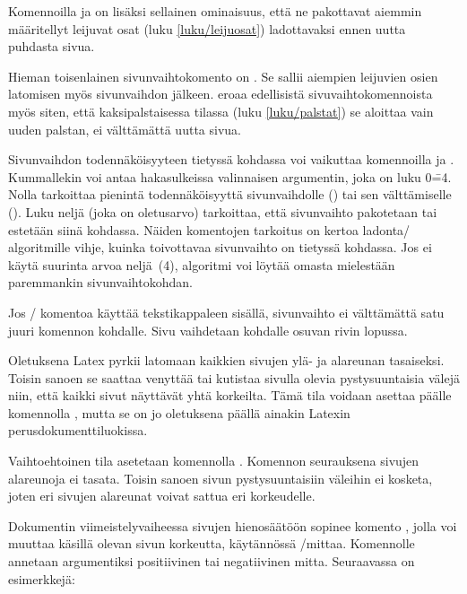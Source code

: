 Komennoilla  ja  on lisäksi
sellainen ominaisuus, että ne pakottavat aiemmin määritellyt leijuvat
osat (luku \ref{luku/leijuosat}) ladottavaksi ennen uutta puhdasta
sivua.

Hieman toisenlainen sivunvaihtokomento on . Se sallii
aiempien leijuvien osien latomisen myös sivunvaihdon jälkeen.
 eroaa edellisistä sivuvaihtokomennoista myös siten,
että kaksipalstaisessa tilassa (luku \ref{luku/palstat}) se aloittaa
vain uuden palstan, ei välttämättä uutta sivua.

Sivunvaihdon todennäköisyyteen tietyssä kohdassa voi vaikuttaa
komennoilla  ja . Kummallekin
voi antaa hakasulkeissa valinnaisen argumentin, joka on luku 0\==4.
Nolla tarkoittaa pienintä todennäköisyyttä sivunvaihdolle
() tai sen välttämiselle
(). Luku neljä (joka on oletusarvo)
tarkoittaa, että sivunvaihto pakotetaan tai estetään siinä kohdassa.
Näiden komentojen tarkoitus on kertoa ladonta\-/ algoritmille vihje,
kuinka toivottavaa sivunvaihto on tietyssä kohdassa. Jos ei käytä
suurinta arvoa neljä~(4), algoritmi voi löytää omasta mielestään
paremmankin sivunvaihtokohdan.

\begin{koodilohkosis}
\pagebreak[3]  %
\nopagebreak   %
\end{koodilohkosis}

Jos \-/ komentoa käyttää tekstikappaleen sisällä,
sivunvaihto ei välttämättä satu juuri komennon kohdalle. Sivu vaihdetaan
kohdalle osuvan rivin lopussa.

Oletuksena Latex pyrkii latomaan kaikkien sivujen ylä- ja alareunan
tasaiseksi. Toisin sanoen se saattaa venyttää tai kutistaa sivulla
olevia pystysuuntaisia välejä niin, että kaikki sivut näyttävät yhtä
korkeilta. Tämä tila voidaan asettaa päälle komennolla
, mutta se on jo oletuksena päällä ainakin Latexin
perusdokumenttiluokissa.

Vaihtoehtoinen tila asetetaan komennolla .
Komennon seurauksena sivujen alareunoja ei tasata. Toisin sanoen sivun
pystysuuntaisiin väleihin ei kosketa, joten eri sivujen alareunat voivat
sattua eri korkeudelle.

Dokumentin viimeistelyvaiheessa sivujen hienosäätöön sopinee komento
, jolla voi muuttaa käsillä olevan sivun
korkeutta, käytännössä \-/mittaa. Komennolle annetaan
argumentiksi positiivinen tai negatiivinen mitta. Seuraavassa on
esimerkkejä:

